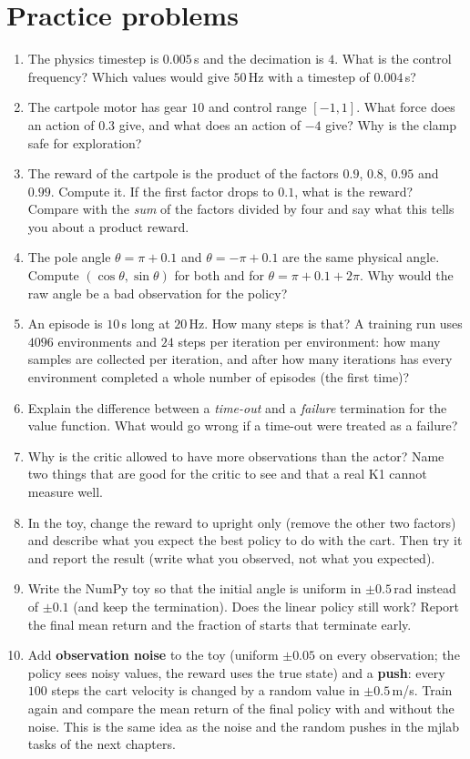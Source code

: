 \section*{Practice problems}
\begin{enumerate}[label=\textbf{\thechapter.\arabic*}]
  \item The physics timestep is $0.005$\,s and the decimation is $4$. What is the control frequency? Which values would give $50$\,Hz with a timestep of $0.004$\,s?
  \item The cartpole motor has gear $10$ and control range $[-1,1]$. What force does an action of $0.3$ give, and what does an action of $-4$ give? Why is the clamp safe for exploration?
  \item The reward of the cartpole is the product of the factors $0.9$, $0.8$, $0.95$ and $0.99$. Compute it. If the first factor drops to $0.1$, what is the reward? Compare with the \emph{sum} of the factors divided by four and say what this tells you about a product reward.
  \item The pole angle $\theta=\pi+0.1$ and $\theta=-\pi+0.1$ are the same physical angle. Compute $(\cos\theta,\sin\theta)$ for both and for $\theta=\pi+0.1+2\pi$. Why would the raw angle be a bad observation for the policy?
  \item An episode is $10$\,s long at $20$\,Hz. How many steps is that? A training run uses $4096$ environments and $24$ steps per iteration per environment: how many samples are collected per iteration, and after how many iterations has every environment completed a whole number of episodes (the first time)?
  \item Explain the difference between a \emph{time-out} and a \emph{failure} termination for the value function. What would go wrong if a time-out were treated as a failure?
  \item Why is the critic allowed to have more observations than the actor? Name two things that are good for the critic to see and that a real K1 cannot measure well.
  \item In the toy, change the reward to $\text{upright}$ only (remove the other two factors) and describe what you expect the best policy to do with the cart. Then try it and report the result (write what you observed, not what you expected).
  \item Write the NumPy toy so that the initial angle is uniform in $\pm0.5$\,rad instead of $\pm0.1$ (and keep the termination). Does the linear policy still work? Report the final mean return and the fraction of starts that terminate early.
  \item[\textbf{\thechapter.10}$\star$] Add \textbf{observation noise} to the toy (uniform $\pm0.05$ on every observation; the policy sees noisy values, the reward uses the true state) and a \textbf{push}: every $100$ steps the cart velocity is changed by a random value in $\pm0.5$\,m/s. Train again and compare the mean return of the final policy with and without the noise. This is the same idea as the noise and the random pushes in the mjlab tasks of the next chapters.
\end{enumerate}
